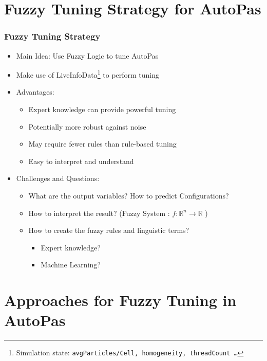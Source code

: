\documentclass[
	10pt,
	t		%
]{beamer}
\begin{document}
\section{Fuzzy Tuning Strategy for AutoPas}
\begin{frame}
	\frametitle{Fuzzy Tuning Strategy}

	\begin{itemize}
		\item Main Idea: Use Fuzzy Logic to tune AutoPas
		\item Make use of LiveInfoData\footnote{Simulation state: \texttt{avgParticles/Cell, homogeneity, threadCount \dots }} to perform tuning
		\item Advantages:
		      \begin{itemize}
			      \item Expert knowledge can provide powerful tuning
			      \item Potentially more robust against noise
			      \item May require fewer rules than rule-based tuning
			      \item Easy to interpret and understand
		      \end{itemize}
		\item Challenges and Questions:
		      \begin{itemize}
			      \item What are the output variables? How to predict Configurations?
			      \item How to interpret the result? (Fuzzy System : $f :\mathbb{R}^n \rightarrow \mathbb{R}$ )
			      \item How to create the fuzzy rules and linguistic terms?
			            \begin{itemize}
				            \item Expert knowledge?
				            \item Machine Learning?
			            \end{itemize}
		      \end{itemize}
	\end{itemize}
\end{frame}

\section{Approaches for Fuzzy Tuning in AutoPas}
\end{document}

